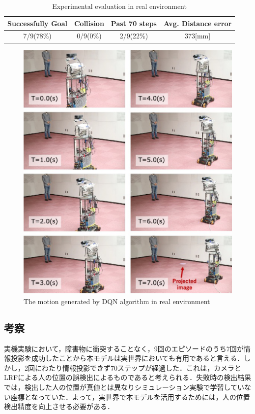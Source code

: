 \documentclass[12pt]{sonota/aislab}
\begin{document}
\begin{table}[t]
	\caption{Experimental evaluation in real environment}
	\label{table:evaluation_real_world}
	\centering 
	\begin{tabular}[tbp]{|c|c|c|c|}
	    \hline
		Successfully Goal & Collision & Past 70 steps & Avg. Distance error \\\hline\hline
		7/9(78\%) & 0/9(0\%) & 2/9(22\%) & 373[mm] \\\hline
	\end{tabular}
\end{table}

\begin{figure}[t]
\begin{center}
\includegraphics[clip, width=13cm]{figs/real_experiment_motion.eps}
\caption{The motion generated by DQN algorithm in real environment}
\label{real_experiment_motion}
\end{center}
\end{figure}

\subsection{考察}
実機実験において，障害物に衝突することなく，9回のエピソードのうち7回が情報投影を成功したことから本モデルは実世界においても有用であると言える．しかし，2回にわたり情報投影できず70ステップが経過した．これは，カメラとLRFによる人の位置の誤検出によるものであると考えられる．失敗時の検出結果では，検出した人の位置が真値とは異なりシミュレーション実験で学習していない座標となっていた．よって，実世界で本モデルを活用するためには，人の位置検出精度を向上させる必要がある．
\end{document}
